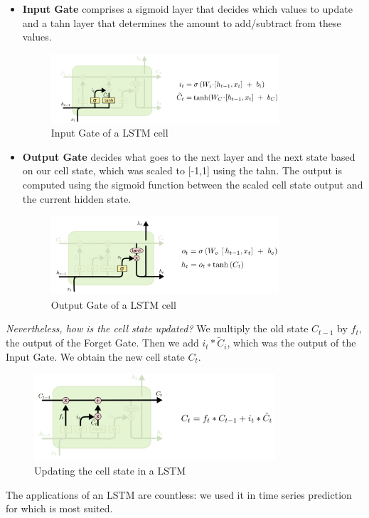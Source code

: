 \begin{itemize}
    \item \textbf{Input Gate} comprises a sigmoid layer that decides which values to update and a tahn layer that determines the amount to add/subtract from these values.
    
    \begin{figure}[H]
        \centering
        \includegraphics[width=0.8\textwidth]{LSTM immagini/input gate.png}
        \caption{Input Gate of a LSTM cell}
    \end{figure}
    
    \item \textbf{Output Gate} decides what goes to the next layer and the next state based on our cell state, which was scaled to [-1,1] using the tahn. The output is computed using the sigmoid function between the scaled cell state output and the current hidden state.
    
    \begin{figure}[H]
        \centering
        \includegraphics[width=0.8\textwidth]{LSTM immagini/output gate.png}
        \caption{Output Gate of a LSTM cell}
    \end{figure}
\end{itemize}
\textit{Nevertheless, how is the cell state updated?}  We multiply the old state $C_{t-1}$ by $f_t$, the output of the Forget Gate. Then we add $i_t * \tilde{C}_i$, which was the output of the Input Gate. We obtain the new cell state $C_t$.

\begin{figure}[H]
    \centering
    \includegraphics[width=0.8\textwidth]{LSTM immagini/update cell state.png}
    \caption{Updating the cell state in a LSTM}
\end{figure}
The applications of an LSTM are countless: we used it in time series prediction for which is most suited.
